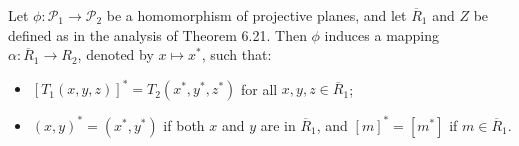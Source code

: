 Let $\phi : \mathcal{P}_1 \to \mathcal{P}_2$ be a homomorphism of projective planes, and let $\overline{R}_1$ and $Z$ be defined as in the analysis of Theorem 6.21. Then $\phi$ induces a mapping $\alpha : \overline{R}_1 \to R_2$, denoted by $x \mapsto x^*$, such that:

\begin{itemize}
\item[(ii)] $[T_1(x, y, z)]^* = T_2(x^*, y^*, z^*)$ for all $x, y, z \in \overline{R}_1$;
\item[(iii)] $(x, y)^* = (x^*, y^*)$ if both $x$ and $y$ are in $\overline{R}_1$, and $[m]^* = [m^*]$ if $m \in \overline{R}_1$.
\end{itemize}
